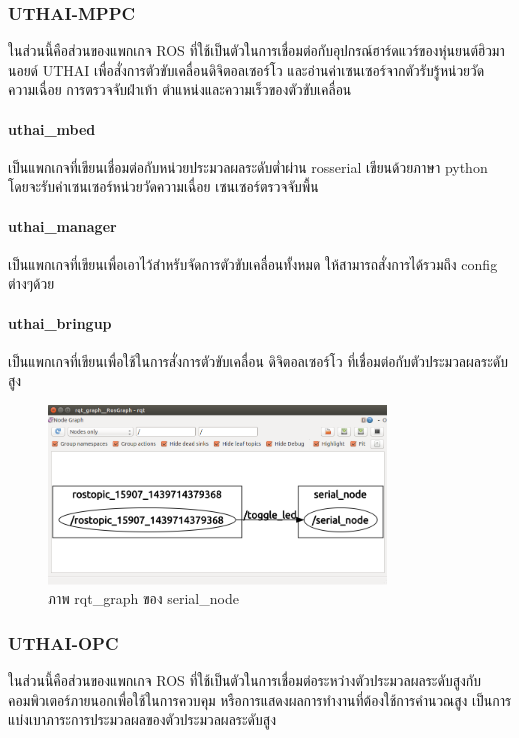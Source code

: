 \clearpage
\subsubsection*{UTHAI-MPPC}
ในส่วนนี้คือส่วนของแพกเกจ ROS ที่ใช้เป็นตัวในการเชื่อมต่อกับอุปกรณ์ฮาร์ดแวร์ของหุ่นยนต์ฮิวมานอยด์ UTHAI
เพื่อสั่งการตัวขับเคลื่อนดิจิตอลเซอร์โว และอ่านค่าเซนเซอร์จากตัวรับรู้หน่วยวัดความเฉื่อย การตรวจจับฝ่าเท้า
ตำแหน่งและความเร็วของตัวขับเคลื่อน
\paragraph*{uthai\_mbed}
เป็นแพกเกจที่เขียนเชื่อมต่อกับหน่วยประมวลผลระดับต่ำผ่าน rosserial เขียนด้วยภาษา python
โดยจะรับค่าเซนเซอร์หน่วยวัดความเฉื่อย เซนเซอร์ตรวจจับพื้น
\paragraph*{uthai\_manager}
เป็นแพกเกจที่เขียนเพื่อเอาไว้สำหรับจัดการตัวขับเคลื่อนทั้งหมด ให้สามารถสั่งการได้รวมถึง config ต่างๆด้วย
\paragraph*{uthai\_bringup}
เป็นแพกเกจที่เขียนเพื่อใช้ในการสั่งการตัวขับเคลื่อน ดิจิตอลเซอร์โว ที่เชื่อมต่อกับตัวประมวลผลระดับสูง

\begin{figure}[!ht]
	\centering
	\includegraphics[width=0.8\textwidth]{chapter4/images/uthai_platform/ros_serial.png}
	\caption{ภาพ rqt\_graph ของ serial\_node}
\end{figure}


\subsubsection*{UTHAI-OPC}
ในส่วนนี้คือส่วนของแพกเกจ ROS ที่ใช้เป็นตัวในการเชื่อมต่อระหว่างตัวประมวลผลระดับสูงกับคอมพิวเตอร์ภายนอกเพื่อใช้ในการควบคุม
หรือการแสดงผลการทำงานที่ต้องใช้การคำนวณสูง เป็นการแบ่งเบาภาระการประมวลผลของตัวประมวลผลระดับสูง

